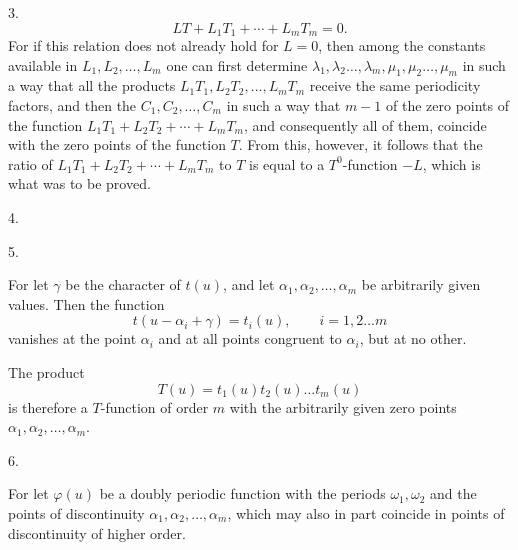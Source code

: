 3. 
\[
LT + L_1T_1 + \cdots + L_mT_m = 0.
\]
For if this relation does not already hold for $L=0$, then among the constants available in $L_1, L_2, \ldots, L_m$ one can first determine $\lambda_1, \lambda_2 \ldots, \lambda_m, \mu_1, \mu_2 \ldots, \mu_m$ in such a way that all the products $L_1T_1, L_2T_2, \ldots, L_mT_m$ receive the same periodicity factors, and then the $C_1, C_2, \ldots, C_m$ in such a way that $m-1$ of the zero points of the function $L_1T_1+L_2T_2+\cdots+L_mT_m$, and consequently all of them, coincide with the zero points of the function $T$. From this, however, it follows that the ratio of $L_1T_1+L_2T_2+\cdots+L_mT_m$ to $T$ is equal to a $T^0$-function $-L$, which is what was to be proved.

4. 

5. 

For let $\gamma$ be the character of $t(u)$, and let $\alpha_1, \alpha_2, \ldots, \alpha_m$ be arbitrarily given values. Then the function
\[
t(u-\alpha_i+\gamma) = t_i(u), \qquad i = 1, 2 \ldots m
\]
vanishes at the point $\alpha_i$ and at all points congruent to $\alpha_i$, but at no other.

The product
\[
T(u) = t_1(u)t_2(u) \ldots t_m(u)
\]
is therefore a $T$-function of order $m$ with the arbitrarily given zero points $\alpha_1, \alpha_2, \ldots, \alpha_m$.

6. 

For let $\varphi(u)$ be a doubly periodic function with the periods $\omega_1, \omega_2$ and the points of discontinuity $\alpha_1, \alpha_2, \ldots, \alpha_m$, which may also in part coincide in points of discontinuity of higher order.
